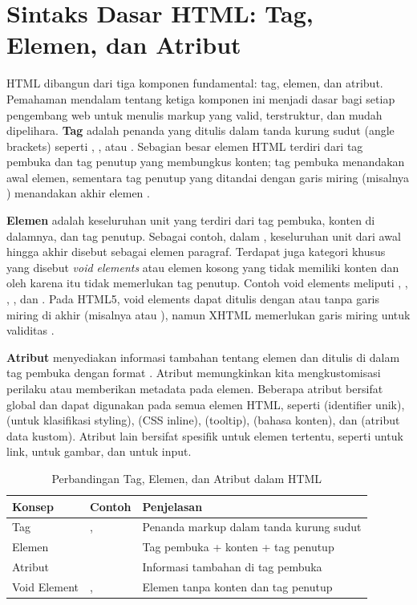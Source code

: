 ﻿\section{Sintaks Dasar HTML: Tag, Elemen, dan Atribut}

HTML dibangun dari tiga komponen fundamental: tag, elemen, dan atribut. Pemahaman mendalam tentang ketiga komponen ini menjadi dasar bagi setiap pengembang web untuk menulis markup yang valid, terstruktur, dan mudah dipelihara. \textbf{Tag} adalah penanda yang ditulis dalam tanda kurung sudut (angle brackets) seperti , , atau . Sebagian besar elemen HTML terdiri dari tag pembuka dan tag penutup yang membungkus konten; tag pembuka menandakan awal elemen, sementara tag penutup yang ditandai dengan garis miring (misalnya ) menandakan akhir elemen \cite{mdnHtmlIntro}.

\textbf{Elemen} adalah keseluruhan unit yang terdiri dari tag pembuka, konten di dalamnya, dan tag penutup. Sebagai contoh, dalam , keseluruhan unit dari awal  hingga akhir  disebut sebagai elemen paragraf. Terdapat juga kategori khusus yang disebut \textit{void elements} atau elemen kosong yang tidak memiliki konten dan oleh karena itu tidak memerlukan tag penutup. Contoh void elements meliputi , , , , dan . Pada HTML5, void elements dapat ditulis dengan atau tanpa garis miring di akhir (misalnya  atau ), namun XHTML memerlukan garis miring untuk validitas \cite{whatwgHtml}.

\textbf{Atribut} menyediakan informasi tambahan tentang elemen dan ditulis di dalam tag pembuka dengan format . Atribut memungkinkan kita mengkustomisasi perilaku atau memberikan metadata pada elemen. Beberapa atribut bersifat global dan dapat digunakan pada semua elemen HTML, seperti  (identifier unik),  (untuk klasifikasi styling),  (CSS inline),  (tooltip),  (bahasa konten), dan  (atribut data kustom). Atribut lain bersifat spesifik untuk elemen tertentu, seperti  untuk link,  untuk gambar, dan  untuk input.

\begin{table}[H]
\centering
\begin{tabular}{|P{3cm}|P{3cm}|P{6cm}|}
\hline
\textbf{Konsep} & \textbf{Contoh} & \textbf{Penjelasan} \\
\hline
Tag & ,  & Penanda markup dalam tanda kurung sudut \\
\hline
Elemen &  & Tag pembuka + konten + tag penutup \\
\hline
Atribut &  & Informasi tambahan di tag pembuka \\
\hline
Void Element & ,  & Elemen tanpa konten dan tag penutup \\
\hline
\end{tabular}
\caption{Perbandingan Tag, Elemen, dan Atribut dalam HTML}
\label{tab:tag-element-attr}
\end{table}

